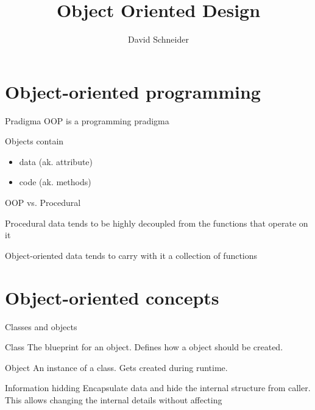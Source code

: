 \documentclass{beamer}
\title{Object Oriented Design}
\author{David Schneider}
\begin{document}
\frame{\titlepage}


\section{Object-oriented programming}

\begin{frame}{Pradigma}
OOP is a programming pradigma

Objects contain
\begin{itemize}
\item data (ak. attribute)
\item code (ak. methods)
\end{itemize}

\end{frame}

\begin{frame}{OOP vs. Procedural}

\begin{block}{Procedural}
data tends to be highly decoupled from the functions that operate on it
\end{block}

\begin{block}{Object-oriented}
data tends to carry with it a collection of functions
\end{block}


\end{frame}

\section{Object-oriented concepts}

\begin{frame}{Classes and objects}

\begin{block}{Class}
The blueprint for an object. Defines how a object should be created.
\end{block}

\begin{block}{Object}
An instance of a class. Gets created during runtime.
\end{block}

\end{frame}

\begin{frame}{Information hidding}
Encapsulate data and hide the internal structure from caller. This allows
changing the internal details without affecting 
\end{frame}
\end{document}
